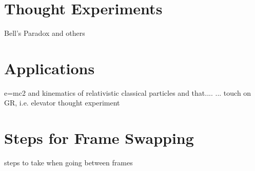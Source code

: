 \chapter{Thought Experiments}
Bell's Paradox and others

\chapter{Applications}

e=mc2 and kinematics of relativistic classical particles and that....\newline
... touch on GR, i.e. elevator thought experiment

\chapter{Steps for Frame Swapping}

steps to take when going between frames